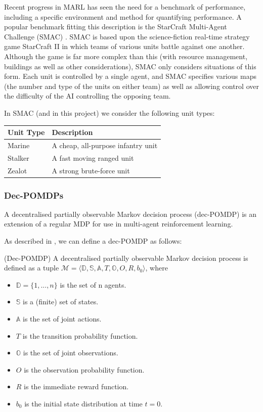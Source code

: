 Recent progress in MARL has seen the need for a benchmark of performance, including a specific environment and method for quantifying performance. A popular benchmark fitting this description is the StarCraft Multi-Agent Challenge (SMAC) \cite{smac}. SMAC is based upon the science-fiction real-time strategy game StarCraft II in which teams of various units battle against one another. Although the game is far more complex than this (with resource management, buildings as well as other considerations), SMAC only considers situations of this form. Each unit is controlled by a single agent, and SMAC specifies various maps (the number and type of the units on either team) as well as allowing control over the difficulty of the AI controlling the opposing team. 


In SMAC (and in this project) we consider the following unit types:

\vspace{3mm}
\begin{center}
\begin{tabular}{ |p{2.5cm}||p{6.6cm}|  }
 \hline
 \centering Unit Type& \centering Description \tabularnewline
 \hline
 \centering Marine   & A cheap, all-purpose infantry unit\tabularnewline
 \hline
 \centering Stalker   & A fast moving ranged unit\tabularnewline
 \hline
 \centering Zealot   &  A strong brute-force unit\tabularnewline
 \hline
 
\end{tabular}
\end{center}
\vspace{3mm}


\subsubsection{Dec-POMDPs}
A decentralised partially observable Markov decision process (dec-POMDP) is an extension of a regular MDP for use in multi-agent reinforcement learning. 

As described in \cite{dec-pomdp}, we can define a dec-POMDP as follows:
\begin{definition}\textbf{}{ (Dec-POMDP)}
A decentralised partially observable Markov decision
process is defined as a tuple $\mathscr{M} = \langle \mathbb{D,S,A},T,\mathbb{O},O,R,b_0\rangle$, where
\begin{itemize}
    \item $\mathbb{D}=\{1,...,n\}$ is the set of n agents.
    \item $\mathbb{S}$ is a (finite) set of states.
    \item $\mathbb{A}$ is the set of joint actions.
    \item $T$ is the transition probability function.
    \item $\mathbb{O}$ is the set of joint observations.
    \item $O$ is the observation probability function.
    \item $R$ is the immediate reward function.
    \item $b_0$ is the initial state distribution at time $t = 0$.
    
\end{itemize}
\end{definition}

